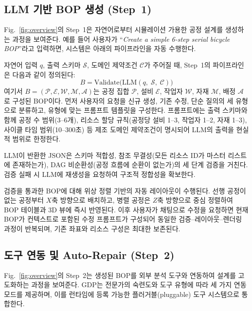 \documentclass[conference]{IEEEtran}
\begin{document}
\subsection{LLM 기반 BOP 생성 (Step~1)}

Fig.~\ref{fig:overview}의 Step~1은 자연어로부터 시뮬레이션 가용한 공정 설계를 생성하는 과정을 보여준다. 예를 들어 사용자가 ``\textit{Create a simple 6-step serial bicycle BOP}''라고 입력하면, 시스템은 아래의 파이프라인을 자동 수행한다.

자연어 입력 $q$, 출력 스키마 $\mathcal{S}$, 도메인 제약조건 $\mathcal{C}$가 주어질 때, Step~1의 파이프라인은 다음과 같이 정의된다:
\begin{equation}
B = \mathrm{Validate}\bigl(\mathrm{LLM}(q,\;\mathcal{S},\;\mathcal{C})\bigr)
\label{eq:step1}
\end{equation}
여기서 $B = (\mathcal{P}, \mathcal{E}, \mathcal{W}, \mathcal{M}, \mathcal{A})$는 공정 집합 $\mathcal{P}$, 설비 $\mathcal{E}$, 작업자 $\mathcal{W}$, 자재 $\mathcal{M}$, 배정 $\mathcal{A}$로 구성된 BOP이다. 먼저 사용자의 요청을 신규 생성, 기존 수정, 단순 질의의 세 유형으로 분류하고, 유형에 맞는 프롬프트 템플릿을 구성한다. 프롬프트에는 출력 스키마와 함께 공정 수 범위(3--6개), 리소스 할당 규칙(공정당 설비 1--3, 작업자 1--2, 자재 1--3), 사이클 타임 범위(10--300초) 등 제조 도메인 제약조건이 명시되어 LLM의 출력을 현실적 범위로 한정한다.

LLM이 반환한 JSON은 스키마 적합성, 참조 무결성(모든 리소스 ID가 마스터 리스트에 존재하는가), DAG 비순환성(공정 흐름에 순환이 없는가)의 세 단계 검증을 거친다. 검증 실패 시 LLM에 재생성을 요청하여 구조적 정합성을 확보한다.

검증을 통과한 BOP에 대해 위상 정렬 기반의 자동 레이아웃이 수행된다. 선행 공정이 없는 공정부터 $X$축 방향으로 배치하고, 병렬 공정은 $Z$축 방향으로 중심 정렬하여 BOP 테이블과 3D 뷰에 즉시 반영된다. 이후 사용자가 채팅으로 수정을 요청하면 현재 BOP가 컨텍스트로 포함된 수정 프롬프트가 구성되어 동일한 검증--레이아웃--렌더링 과정이 반복되며, 기존 좌표와 리소스 구성은 최대한 보존된다.

\subsection{도구 연동 및 Auto-Repair (Step~2)}

Fig.~\ref{fig:overview}의 Step~2는 생성된 BOP를 외부 분석 도구와 연동하여 설계를 고도화하는 과정을 보여준다. GDP는 전문가의 숙련도와 도구 유형에 따라 세 가지 연동 모드를 제공하며, 이를 런타임에 등록 가능한 플러거블(pluggable) 도구 시스템으로 통합한다.
\end{document}
